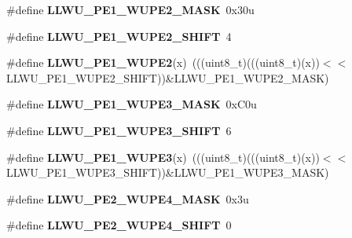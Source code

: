 \begin{DoxyCompactItemize}
\item 
\#define {\bfseries L\+L\+W\+U\+\_\+\+P\+E1\+\_\+\+W\+U\+P\+E2\+\_\+\+M\+A\+SK}~0x30u\hypertarget{group__LLWU__Register__Masks_ga97e8e2fc8ce673f6b4625d307bc94b4a}{}\label{group__LLWU__Register__Masks_ga97e8e2fc8ce673f6b4625d307bc94b4a}

\item 
\#define {\bfseries L\+L\+W\+U\+\_\+\+P\+E1\+\_\+\+W\+U\+P\+E2\+\_\+\+S\+H\+I\+FT}~4\hypertarget{group__LLWU__Register__Masks_ga0b1bb86eb31a82a18ad1491b0305000b}{}\label{group__LLWU__Register__Masks_ga0b1bb86eb31a82a18ad1491b0305000b}

\item 
\#define {\bfseries L\+L\+W\+U\+\_\+\+P\+E1\+\_\+\+W\+U\+P\+E2}(x)~(((uint8\+\_\+t)(((uint8\+\_\+t)(x))$<$$<$L\+L\+W\+U\+\_\+\+P\+E1\+\_\+\+W\+U\+P\+E2\+\_\+\+S\+H\+I\+FT))\&L\+L\+W\+U\+\_\+\+P\+E1\+\_\+\+W\+U\+P\+E2\+\_\+\+M\+A\+SK)\hypertarget{group__LLWU__Register__Masks_gae6a462624a848afff074ae6e6da83cb0}{}\label{group__LLWU__Register__Masks_gae6a462624a848afff074ae6e6da83cb0}

\item 
\#define {\bfseries L\+L\+W\+U\+\_\+\+P\+E1\+\_\+\+W\+U\+P\+E3\+\_\+\+M\+A\+SK}~0x\+C0u\hypertarget{group__LLWU__Register__Masks_ga44cae929b3178e210eb5e1346a4ce997}{}\label{group__LLWU__Register__Masks_ga44cae929b3178e210eb5e1346a4ce997}

\item 
\#define {\bfseries L\+L\+W\+U\+\_\+\+P\+E1\+\_\+\+W\+U\+P\+E3\+\_\+\+S\+H\+I\+FT}~6\hypertarget{group__LLWU__Register__Masks_gaceee1b1b6323ba4d33abf875718e885a}{}\label{group__LLWU__Register__Masks_gaceee1b1b6323ba4d33abf875718e885a}

\item 
\#define {\bfseries L\+L\+W\+U\+\_\+\+P\+E1\+\_\+\+W\+U\+P\+E3}(x)~(((uint8\+\_\+t)(((uint8\+\_\+t)(x))$<$$<$L\+L\+W\+U\+\_\+\+P\+E1\+\_\+\+W\+U\+P\+E3\+\_\+\+S\+H\+I\+FT))\&L\+L\+W\+U\+\_\+\+P\+E1\+\_\+\+W\+U\+P\+E3\+\_\+\+M\+A\+SK)\hypertarget{group__LLWU__Register__Masks_ga3dfb03917664cd276f352b77e95624b9}{}\label{group__LLWU__Register__Masks_ga3dfb03917664cd276f352b77e95624b9}

\item 
\#define {\bfseries L\+L\+W\+U\+\_\+\+P\+E2\+\_\+\+W\+U\+P\+E4\+\_\+\+M\+A\+SK}~0x3u\hypertarget{group__LLWU__Register__Masks_ga94128d26c60f13d22acf47200f4f37e0}{}\label{group__LLWU__Register__Masks_ga94128d26c60f13d22acf47200f4f37e0}

\item 
\#define {\bfseries L\+L\+W\+U\+\_\+\+P\+E2\+\_\+\+W\+U\+P\+E4\+\_\+\+S\+H\+I\+FT}~0\hypertarget{group__LLWU__Register__Masks_ga12aa6ffb998e5273a8dd548ac434ad41}{}\label{group__LLWU__Register__Masks_ga12aa6ffb998e5273a8dd548ac434ad41}


\end{DoxyCompactItemize}
